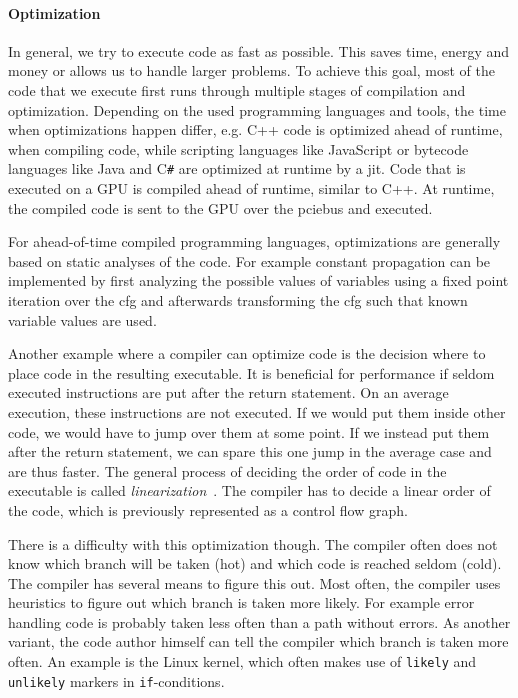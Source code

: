 \paragraph{Optimization} In general, we try to execute code as fast as possible. This saves time, energy and money or allows us to handle larger problems. To achieve this goal, most of the code that we execute first runs through multiple stages of compilation and optimization. Depending on the used programming languages and tools, the time when optimizations happen differ, e.g. C++ code is optimized ahead of runtime, when compiling code, while scripting languages like JavaScript or bytecode languages like Java and C\texttt{\#} are optimized at runtime by a \gls{jit}. Code that is executed on a GPU is compiled ahead of runtime, similar to C++. At runtime, the compiled code is sent to the GPU over the \gls{pciebus} and executed.

For ahead-of-time compiled programming languages, optimizations are generally based on static analyses of the code. For example constant propagation can be implemented by first analyzing the possible values of variables using a fixed point iteration over the \gls{cfg} and afterwards transforming the \gls{cfg} such that known variable values are used.~\cite{Seidl2010}

Another example where a compiler can optimize code is the decision where to place code in the resulting executable. It is beneficial for performance if seldom executed instructions are put after the return statement. On an average execution, these instructions are not executed. If we would put them inside other code, we would have to jump over them at some point. If we instead put them after the return statement, we can spare this one jump in the average case and are thus faster. The general process of deciding the order of code in the executable is called \emph{linearization}~\cite{Seidl2010}. The compiler has to decide a linear order of the code, which is previously represented as a control flow graph.

There is a difficulty with this optimization though. The compiler often does not know which branch will be taken (hot) and which code is reached seldom (cold). The compiler has several means to figure this out. Most often, the compiler uses heuristics to figure out which branch is taken more likely. For example error handling code is probably taken less often than a path without errors. As another variant, the code author himself can tell the compiler which branch is taken more often. An example is the Linux kernel, which often makes use of \texttt{likely} and \texttt{unlikely} markers in \texttt{if}-conditions.

